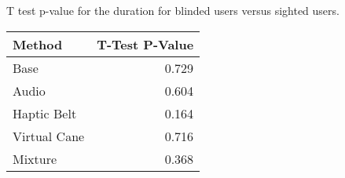 
\centering
\caption{T test p-value for the duration for blinded users versus sighted users.}
\label{tab:ttest_duration}
\begin{tabular}{lr}
\toprule
      Method &  T-Test P-Value \\
\midrule
        Base &           0.729 \\
       Audio &           0.604 \\
 Haptic Belt &           0.164 \\
Virtual Cane &           0.716 \\
     Mixture &           0.368 \\
\bottomrule
\end{tabular}

